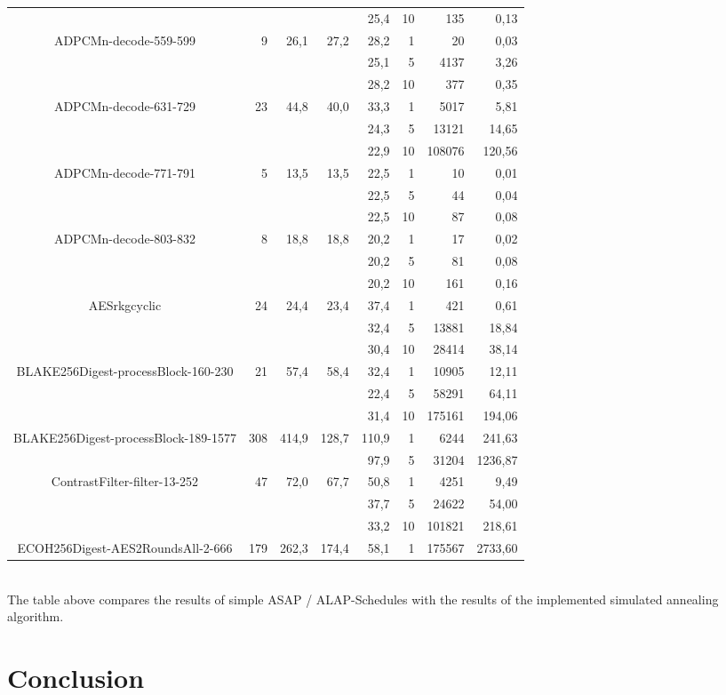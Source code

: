 \documentclass[colorback,accentcolor=tud1c,11pt]{tudreport}
\begin{document}
\begin{tabular}{ c | r | r | r | r | r | r | r }
    &  &  &  & 25,4 & 10 & 135 & 0,13 \\
   \multirow{3}{*}{ADPCMn-decode-559-599} & \multirow{3}{*}{9} & \multirow{3}{*}{26,1} & \multirow{3}{*}{27,2} & 28,2 & 1 & 20 & 0,03 \\
    &  &  &  & 25,1 & 5 & 4137 & 3,26 \\
   &  &  &  & 28,2 & 10 & 377 & 0,35 \\
   \multirow{3}{*}{ADPCMn-decode-631-729} & \multirow{3}{*}{23} & \multirow{3}{*}{44,8} & \multirow{3}{*}{40,0} & 33,3 & 1 & 5017 & 5,81 \\
    &  &  &  & 24,3 & 5 & 13121 & 14,65 \\
    &  &  &  & 22,9 & 10 & 108076 & 120,56 \\
   \multirow{3}{*}{ADPCMn-decode-771-791} & \multirow{3}{*}{5} & \multirow{3}{*}{13,5} & \multirow{3}{*}{13,5} & 22,5 & 1 & 10 & 0,01 \\
    &  &  &  & 22,5 & 5 & 44 & 0,04 \\
    &  &  &  & 22,5 & 10 & 87 & 0,08 \\
   \multirow{3}{*}{ADPCMn-decode-803-832} & \multirow{3}{*}{8} & \multirow{3}{*}{18,8} & \multirow{3}{*}{18,8} & 20,2 & 1 & 17 & 0,02 \\
    &  &  &  & 20,2 & 5 & 81 & 0,08 \\
    &  &  &  & 20,2 & 10 & 161 & 0,16 \\
   \multirow{3}{*}{AESrkgcyclic} & \multirow{3}{*}{24} & \multirow{3}{*}{24,4} & \multirow{3}{*}{23,4} & 37,4 & 1 & 421 & 0,61 \\
    &  &  &  & 32,4 & 5 & 13881 & 18,84 \\
    &  &  &  & 30,4 & 10 & 28414 & 38,14 \\
   \multirow{3}{*}{BLAKE256Digest-processBlock-160-230} & \multirow{3}{*}{21} & \multirow{3}{*}{57,4} & \multirow{3}{*}{58,4} & 32,4 & 1 & 10905 & 12,11 \\
    &  &  &  & 22,4 & 5 & 58291 & 64,11 \\
    &  &  &  & 31,4 & 10 & 175161 & 194,06 \\
   \multirow{2}{*}{BLAKE256Digest-processBlock-189-1577} & \multirow{2}{*}{308} & \multirow{2}{*}{414,9} & \multirow{2}{*}{128,7} & 110,9 & 1 & 6244 & 241,63 \\
    &  &  &  & 97,9 & 5 & 31204 & 1236,87 \\
   \multirow{3}{*}{ContrastFilter-filter-13-252} & \multirow{3}{*}{47} & \multirow{3}{*}{72,0} & \multirow{3}{*}{67,7} & 50,8 & 1 & 4251 & 9,49 \\
   &  &  &  & 37,7 & 5 & 24622 & 54,00 \\
    &  &  &  & 33,2 & 10 & 101821 & 218,61 \\
   \multirow{1}{*}{ECOH256Digest-AES2RoundsAll-2-666} & \multirow{1}{*}{179} & \multirow{1}{*}{262,3} & \multirow{1}{*}{174,4} & 58,1 & 1 & 175567 & 2733,60 \\
  \end{tabular}\\
  The table above compares the results of simple ASAP / ALAP-Schedules with the results of the implemented simulated annealing algorithm.
 


 
 \chapter{Conclusion}
 

%  
%  
\end{document}
